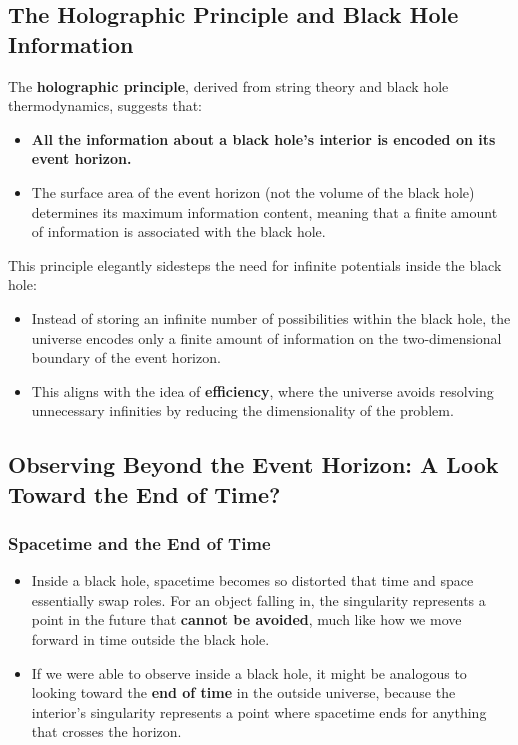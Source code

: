 \documentclass[12pt]{article}
\begin{document}
\subsection{The Holographic Principle and Black Hole Information}

The \textbf{holographic principle}, derived from string theory and black hole thermodynamics, suggests that:
\begin{itemize}
    \item \textbf{All the information about a black hole's interior is encoded on its event horizon.}
    \item The surface area of the event horizon (not the volume of the black hole) determines its maximum information content, meaning that a finite amount of information is associated with the black hole.
\end{itemize}

This principle elegantly sidesteps the need for infinite potentials inside the black hole:
\begin{itemize}
    \item Instead of storing an infinite number of possibilities within the black hole, the universe encodes only a finite amount of information on the two-dimensional boundary of the event horizon.
    \item This aligns with the idea of \textbf{efficiency}, where the universe avoids resolving unnecessary infinities by reducing the dimensionality of the problem.
\end{itemize}

\subsection{Observing Beyond the Event Horizon: A Look Toward the End of Time?}

\subsubsection{Spacetime and the End of Time}
\begin{itemize}
    \item Inside a black hole, spacetime becomes so distorted that time and space essentially swap roles. For an object falling in, the singularity represents a point in the future that \textbf{cannot be avoided}, much like how we move forward in time outside the black hole.
    \item If we were able to observe inside a black hole, it might be analogous to looking toward the \textbf{end of time} in the outside universe, because the interior's singularity represents a point where spacetime ends for anything that crosses the horizon.
\end{itemize}
\end{document}
